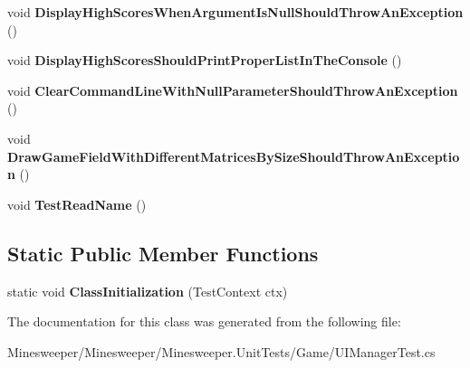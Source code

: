 \begin{DoxyCompactItemize}
\item 
\hypertarget{class_minesweeper_1_1_unit_tests_1_1_game_1_1_u_i_manager_test_a8e6c3136537d37b82c6b3daf59d56bb3}{void {\bfseries Display\+High\+Scores\+When\+Argument\+Is\+Null\+Should\+Throw\+An\+Exception} ()}\label{class_minesweeper_1_1_unit_tests_1_1_game_1_1_u_i_manager_test_a8e6c3136537d37b82c6b3daf59d56bb3}

\item 
\hypertarget{class_minesweeper_1_1_unit_tests_1_1_game_1_1_u_i_manager_test_a8b1a2dbef62b42a328c60fc5bd42040d}{void {\bfseries Display\+High\+Scores\+Should\+Print\+Proper\+List\+In\+The\+Console} ()}\label{class_minesweeper_1_1_unit_tests_1_1_game_1_1_u_i_manager_test_a8b1a2dbef62b42a328c60fc5bd42040d}

\item 
\hypertarget{class_minesweeper_1_1_unit_tests_1_1_game_1_1_u_i_manager_test_a508682d8da77a4e9f1fba7a96d11d36a}{void {\bfseries Clear\+Command\+Line\+With\+Null\+Parameter\+Should\+Throw\+An\+Exception} ()}\label{class_minesweeper_1_1_unit_tests_1_1_game_1_1_u_i_manager_test_a508682d8da77a4e9f1fba7a96d11d36a}

\item 
\hypertarget{class_minesweeper_1_1_unit_tests_1_1_game_1_1_u_i_manager_test_a34a6e403b0fe20e494342a1b746999c2}{void {\bfseries Draw\+Game\+Field\+With\+Different\+Matrices\+By\+Size\+Should\+Throw\+An\+Exception} ()}\label{class_minesweeper_1_1_unit_tests_1_1_game_1_1_u_i_manager_test_a34a6e403b0fe20e494342a1b746999c2}

\item 
\hypertarget{class_minesweeper_1_1_unit_tests_1_1_game_1_1_u_i_manager_test_ad343db56504a5850b0e27d9ed6a4fafa}{void {\bfseries Test\+Read\+Name} ()}\label{class_minesweeper_1_1_unit_tests_1_1_game_1_1_u_i_manager_test_ad343db56504a5850b0e27d9ed6a4fafa}

\end{DoxyCompactItemize}
\subsection*{Static Public Member Functions}
\begin{DoxyCompactItemize}
\item 
\hypertarget{class_minesweeper_1_1_unit_tests_1_1_game_1_1_u_i_manager_test_a6e798aa81cb723e138dfc4205b9eceba}{static void {\bfseries Class\+Initialization} (Test\+Context ctx)}\label{class_minesweeper_1_1_unit_tests_1_1_game_1_1_u_i_manager_test_a6e798aa81cb723e138dfc4205b9eceba}

\end{DoxyCompactItemize}


The documentation for this class was generated from the following file\+:\begin{DoxyCompactItemize}
\item 
Minesweeper/\+Minesweeper/\+Minesweeper.\+Unit\+Tests/\+Game/U\+I\+Manager\+Test.\+cs\end{DoxyCompactItemize}
